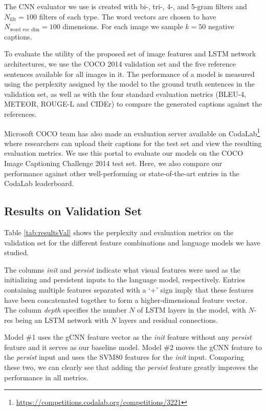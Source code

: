 The CNN evaluator we use is created with bi-, tri-, 4-, and 5-gram filters and
$N_{\text{filt}}=100$ filters of each type.
The word vectors are chosen to have $N_{\text{word vec dim}}=100$ dimensions.
For each image we sample $k=50$ negative captions.

To evaluate the utility of the proposed set of image features and LSTM network
architectures, we use the COCO 2014 validation set and the five reference
sentences available for all images in it.
The performance of a model is measured using the perplexity assigned by the
model to the ground truth sentences in the validation set, as well as with the
four standard evaluation metrics (BLEU-4, METEOR, ROUGE-L and CIDEr) to compare
the generated captions against the references.

Microsoft COCO team has also made an evaluation server available on
CodaLab\footnote{\url{https://competitions.codalab.org/competitions/3221}} where
researchers can upload their captions for the test set and view the resulting
evaluation metrics.
We use this portal to evaluate our models on the COCO Image Captioning Challenge
2014 test set. 
Here, we also compare our performance against other well-performing or
state-of-the-art entries in the CodaLab leaderboard.


\subsection{Results on Validation Set}

Table \ref{tab:resultsVal} shows the perplexity and evaluation metrics on the
validation set for the different feature combinations and language models we
have studied.

The columns \emph{init} and \emph{persist} indicate what visual features were
used as the initializing and persistent inputs to the language model,
respectively.
Entries containing multiple features separated with a `+' sign imply that these
features have been concatenated together to form a higher-dimensional feature
vector.
The column \emph{depth} specifies the number $N$ of LSTM layers in the model,
with $N$-res being an LSTM network with $N$ layers and residual connections.

Model \#1 uses the gCNN feature vector as the \emph{init} feature without any
\emph{persist} feature and it serves as our baseline model.
Model \#2 moves the gCNN feature to the \emph{persist} input and uses the SVM80
features for the \emph{init} input. 
Comparing these two, we can clearly see that adding the \emph{persist} feature
greatly improves the performance in all metrics.

